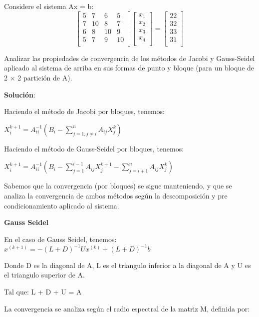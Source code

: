 Considere el sistema Ax = b:
\[
\begin{bmatrix}
    5 & 7 & 6 & 5\\
    7 & 10 & 8 & 7 \\
    6 &  8 & 10 & 9 \\
    5 & 7 & 9 & 10\\
\end{bmatrix}
\begin{bmatrix}
    x_{1} \\
    x_{2} \\
    x_{3} \\
    x_{4} \\
\end{bmatrix}
=
\begin{bmatrix}
    22 \\
    32\\
    33\\
    31\\
\end{bmatrix}
\]

Analizar las propiedades de convergencia de los métodos de Jacobi y Gauss-Seidel aplicado al sistema de arriba en sus formas de punto y bloque (para un bloque de 2 × 2 partición de A).

\textbf{Solución}:

Haciendo el método de Jacobi por bloques, tenemos:
\begin{center}
$X^{k+1}_i = A^{-1}_{ii}  (B_i − \sum_{j=1, j \neq i}^{n} A_{ij} X^k _ j)$
\end{center}

Haciendo el método de Gauss-Seidel por bloques, tenemos:
\begin{center}
$X^{k+1}_i = A^{-1}_{ii}  (B_i − \sum_{j=1}^{i-1} A_{ij} X^{k+1} _ j − \sum_{j=i+1}^{n} A_{ij} X^{k} _ j )$
\end{center}

Sabemos que la convergencia (por bloques) se sigue manteniendo, y que se analiza la convergencia de ambos métodos según la descomposición y pre condicionamiento aplicado al sistema.

\textbf{Gauss Seidel}

En el caso de Gauss Seidel, tenemos:
$x^{(k+1)}={-(L+D)}^{-1}{U}x^{(k)}+{(L+D)}^{-1}b$

Donde D es la diagonal de A, L es el triangulo inferior a la diagonal de A y U es el triangulo superior de A.

Tal que: L + D + U = A

La convergencia se analiza según el radio espectral de la matriz M, definida por:

